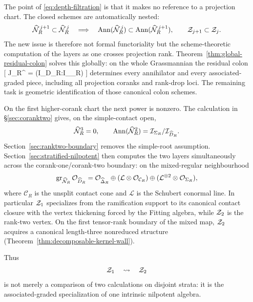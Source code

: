 The point of \eqref{eq:depth-filtration} is that it makes no reference
to a projection chart.  The closed schemes are automatically nested:
\[
 \widehat{\mathcal N}_R^{\,j+1}\subset\widehat{\mathcal N}_R^{\,j}
 \quad\Longrightarrow\quad
 \operatorname{Ann}(\widehat{\mathcal N}_R^{\,j})
 \subset
 \operatorname{Ann}(\widehat{\mathcal N}_R^{\,j+1}),
 \qquad
 \mathcal Z_{j+1}\subset\mathcal Z_j.
\]
The new issue is therefore not formal functoriality but the
scheme-theoretic computation of the layers as one crosses projection
rank.  Theorem~\ref{thm:global-residual-colon} solves this globally:
on the whole Grassmannian the residual colon
[
 \mathcal J_R^{}
 =
 (\mathcal I_{\widehat D_R}:\mathcal I_{\widehat\Delta_R})
]
determines every annihilator and every associated-graded piece,
including all projection coranks and rank-drop loci.  The remaining
task is geometric identification of those canonical colon schemes.

On the first higher-corank chart the next power is nonzero.
The calculation in \S\ref{sec:coranktwo} gives, on the simple-contact
open,
\[
 \widehat{\mathcal N}_R^3=0,\qquad
 \operatorname{Ann}(\widehat{\mathcal N}_R^2)=\mathcal I_{\Sigma_R}/\mathcal I_{\widehat D_R}.
\]
Section~\ref{sec:ranktwo-boundary} removes the simple-root assumption.
Section~\ref{sec:stratified-nilpotent} then computes the two layers
simultaneously across the corank-one/corank-two boundary: on the
mixed-regular neighbourhood
\[
 \operatorname{gr}_{\widehat{\mathcal N}_R}\mathcal O_{\widehat D_R}
 =
 \mathcal O_{\widehat\Delta_R}
 \oplus
 (\mathcal L\otimes\mathcal O_{\mathcal C_R})
 \oplus
 (\mathcal L^{\otimes2}\otimes\mathcal O_{\Sigma_R}),
\]
where \(\mathcal C_R\) is the unsplit contact cone and
\(\mathcal L\) is the Schubert conormal line.  In particular
\(\mathcal Z_1\) specializes from the ramification support to its canonical
contact closure with the vertex thickening forced by the Fitting
algebra, while \(\mathcal Z_2\) is the rank-two vertex.  On the first
tensor-rank boundary of the mixed map, \(\mathcal Z_2\) acquires a
canonical length-three nonreduced structure
(Theorem~\ref{thm:decomposable-kernel-wall}).

Thus
\[
 \mathcal Z_1\quad\leadsto\quad\mathcal Z_2
\]
is not merely a comparison of two calculations on disjoint strata:
it is the associated-graded specialization of one intrinsic
nilpotent algebra.

